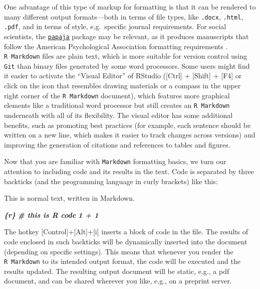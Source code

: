 \documentclass[psych,tutorial,accept,moreauthors,pdftex]{Definitions/mdpi}
\newenvironment{Shaded}{\begin{snugshade}}{\end{snugshade}}
\newcommand{\InformationTok}[1]{\textcolor[rgb]{0.56,0.35,0.01}{\textbf{\textit{#1}}}}
\newcommand{\NormalTok}[1]{#1}
\begin{document}
\begin{paracol}{2}
One advantage of this type of markup for formatting is that it can be
rendered to many different output formats---both in terms of file types,
like \texttt{.docx}, \texttt{.html}, \texttt{.pdf}, and in terms of
style, e.g.~specific journal requirements. For social scientists, the
\href{https://github.com/crsh/papaja}{\texttt{papaja}} package
\citep{papaja} may be relevant, as it produces manuscripts that follow
the American Psychological Association formatting requirements
\citep{apa7}. \texttt{R\ Markdown} files are plain text, which is more
suitable for version control using \texttt{Git} than binary files
generated by some word processors. Some users might find it easier to
activate the ``Visual Editor'' of RStudio ({[}Ctrl{]} + {[}Shift{]} +
{[}F4{]} or click on the icon that resembles drawing materials or a
compass in the upper right corner of the \texttt{R\ Markdown} document),
which features more graphical elements like a traditional word processor
but still creates an \texttt{R\ Markdown} underneath with all of its
flexibility. The visual editor has some additional benefits, such as
promoting best practices (for example, each sentence should be written
on a new line, which makes it easier to track changes across versions)
and improving the generation of citations and references to tables and
figures.

Now that you are familiar with \texttt{Markdown} formatting basics, we
turn our attention to including code and its results in the text. Code
is separated by three backticks (and the programming language in curly
brackets) like this:

\begin{adjustwidth}{0.5cm}{0cm} 
\begin{Shaded}
\begin{Highlighting}[]
\NormalTok{This is normal text, written in Markdown.}

\InformationTok{\textasciigrave{}\textasciigrave{}\textasciigrave{}\{r\}}
\InformationTok{\# this is R code}
\InformationTok{1 + 1}
\InformationTok{\textasciigrave{}\textasciigrave{}\textasciigrave{}}
\end{Highlighting}
\end{Shaded}
\end{adjustwidth}

The hotkey {[}Control{]}+{[}Alt{]}+{[}i{]} inserts a block of code in
the file. The results of code enclosed in such backticks will be
dynamically inserted into the document (depending on specific settings).
This means that whenever you render the \texttt{R\ Markdown} to its
intended output format, the code will be executed and the results
updated. The resulting output document will be static, e.g., a pdf
document, and can be shared wherever you like, e.g., on a preprint
server.


\end{paracol}
\end{document}

